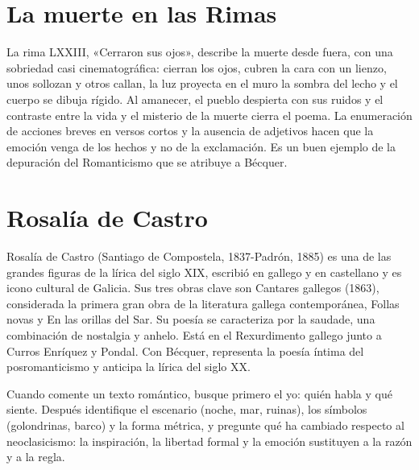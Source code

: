 \documentclass{book}
\begin{document}

\section{La muerte en las Rimas}

La rima LXXIII, «Cerraron sus ojos», describe la muerte desde fuera, con una sobriedad casi cinematográfica: cierran los ojos, cubren la cara con un lienzo, unos sollozan y otros callan, la luz proyecta en el muro la sombra del lecho y el cuerpo se dibuja rígido. Al amanecer, el pueblo despierta con sus ruidos y el contraste entre la vida y el misterio de la muerte cierra el poema. La enumeración de acciones breves en versos cortos y la ausencia de adjetivos hacen que la emoción venga de los hechos y no de la exclamación. Es un buen ejemplo de la depuración del Romanticismo que se atribuye a Bécquer.


\section{Rosalía de Castro}

Rosalía de Castro (Santiago de Compostela, 1837-Padrón, 1885) es una de las grandes figuras de la lírica del siglo XIX, escribió en gallego y en castellano y es icono cultural de Galicia. Sus tres obras clave son Cantares gallegos (1863), considerada la primera gran obra de la literatura gallega contemporánea, Follas novas y En las orillas del Sar. Su poesía se caracteriza por la saudade, una combinación de nostalgia y anhelo. Está en el Rexurdimento gallego junto a Curros Enríquez y Pondal. Con Bécquer, representa la poesía íntima del posromanticismo y anticipa la lírica del siglo XX.


\begin{tcolorbox}[title={Consejo}, studiumtip, breakable]

Cuando comente un texto romántico, busque primero el yo: quién habla y qué siente. Después identifique el escenario (noche, mar, ruinas), los símbolos (golondrinas, barco) y la forma métrica, y pregunte qué ha cambiado respecto al neoclasicismo: la inspiración, la libertad formal y la emoción sustituyen a la razón y a la regla.

\end{tcolorbox}
\end{document}
